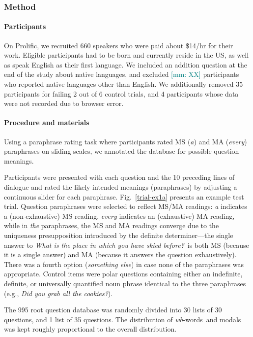 \documentclass[12pt,letterpaper,table,svgnames,dvipsnames]{article}
\newcommand{\mm}[1]{\textcolor{teal}{[mm: #1]}}
\newcommand{\figref}[1]{Fig.~\ref{#1}}
\newcommand{\whws}{\emph{wh}-words~}
\begin{document}
\subsubsection{Method}

\paragraph{Participants}

On Prolific, we recruited 660 speakers who were paid about \$14/hr for their work. Eligible participants had to be born and currently reside in the US, as well as speak English as their first language. We included an addition question at the end of the study about native languages, and excluded \mm{XX} participants who reported native languages other than English. We additionally removed 35 participants for failing 2 out of 6 control trials, and 4 participants whose data were not recorded due to browser error.

\paragraph{Procedure and materials}
Using a paraphrase rating task where participants rated MS (\emph{a}) and MA (\emph{every}) paraphrases on sliding scales, we annotated the database for possible question meanings.

Participants were presented with each question and the 10 preceding lines of dialogue and rated the likely intended meanings (paraphrases) by adjusting a continuous slider for each paraphrase. \figref{trial-ex1a} presents an example test trial. Question paraphrases were selected to reflect MS/MA readings: \emph{a} indicates a (non-exhaustive) MS reading, \emph{every} indicates an (exhaustive) MA reading, while in \emph{the} paraphrases, the MS and MA readings converge due to the uniqueness presupposition introduced by the definite determiner---the single answer to \emph{What is the place in which you have skied before?}~is both MS (because it is a single answer) and MA (because it answers the question exhaustively). There was a fourth option (\emph{something else}) in case none of the paraphrases was appropriate. Control items were polar questions containing either an indefinite, definite, or universally quantified noun phrase identical to the three paraphrases (e.g., \emph{Did you grab all the cookies?}).

The 995 root question database was randomly divided into 30 lists of 30 questions, and 1 list of 35 questions. The distribution of \whws and modals was kept roughly proportional to the overall distribution. %
\end{document}
